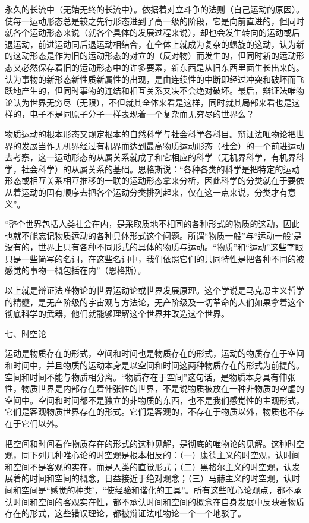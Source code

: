 永久的长流中（无始无终的长流中）。依据着对立斗争的法则（自己运动的原因）。使每一运动形态总是较之先行形态进到了高一级的阶段，它是向前直进的，但同时就各个运动形态来说（就各个具体的发展过程来说），却也会发生转向的运动或后退运动，前进运动同后退运动相结合，在全体上就成为复杂的螺旋的这动，认为新的这动形态是作为旧的运动形态的对立的（反对物）而发生的，但同时新的运动形态又必然保存着旧的运动形态中的许多要素，新东西是从旧东西里面生长出来的。认为事物的新形态新性质新属性的出现，是由连续性的中断即经过冲突和破坏而飞跃地产生的，但同时事物的连结和相互关系又决不会绝对破坏。最后，辩证法唯物论认为世界无穷尽（无限），不但就其全体来看是这样，同时就其局部来看也是这样的，电子不是同原子分子一样表现着一个复杂而无穷尽的世界么？

物质运动的根本形态又规定根本的自然科学与社会科学各科目。辩证法唯物论把世界的发展当作无机界经过有机界而达到最高物质运动形态（社会）的一个前进运动去考察，这一运动形态的从属关系就成了和它相应的科学（无机界科学，有机界科学，社会科学）的从属关系的基础。恩格斯说：“各种各类的科学是把特定的运动形态或相互关系相互推移的一联的运动形态拿来分析，因此科学的分类就在于要依从着运动的固有顺序去把各个运动分类排列起来，仅在这一点来说，分类才有意义”。

“整个世界包括人类社会在内，是采取质地不相同的各种形式的物质的这动，因此也就不能忘记物质运动的各种具体形式这个问题。所谓“物质一般”与“运动一般’是没有的，世界上只有各种不同形式的具体的物质与运动。“物质”和“运动”这些字眼只是一些简写的名词，在这些名词中，我们依照它们的共同特性是把各种不同的被感觉的事物一概包括在内”（恩格斯）。

以上就是辩证法唯物论的世界运动论或世界发展原理。这个学说是马克思主义哲学的精髓，是无产阶级的宇宙观与方法论，无产阶级及一切革命的人们如果拿着这个彻底科学的武器，他们就能够理解这个世界并改造这个世界。

七、时空论

运动是物质存在的形式，空间和时间也是物质存在的形式，运动的物质存在于空间和时间中，并且物质的运动本身是以空间和时间这两种物质存在的形式为前提的。空间和时间不能与物质相分离。“物质存在于空间”这句话，是物质本身具有伸张性，物质世界是内部存在着伸张性的世界，不是说物质被放在一种非物质的空虚的空间中。空间和时间都不是独立的非物质的东西，也不是我们感觉性的主观形式，它们是客观物质世界存在的形式。它们是客观的，不存在于物质以外，物质也不存在于它们以外。

把空间和时间看作物质存在的形式的这种见解，是彻底的唯物论的见解。这种时空观，同下列几种唯心论的时空观是根本相反的：（一）康德主义的时空观，认时间和空间不是客观的实在，而是人类的直觉形式；（二）黑格尔主义的时空观，认发展着的时间和空间的概念，日益接近于绝对观念；（三）马赫主义的时空观，认时间和空间是“感觉的种类’，“使经验和谐化的工具”。所有这些唯心论观点，都不承认时间和空间的客观实在性，都不承认时间和空间的概念在自身发展中反映着物质存在的形式，这些错误理论，都被辩证法唯物论一个一个地驳了。

